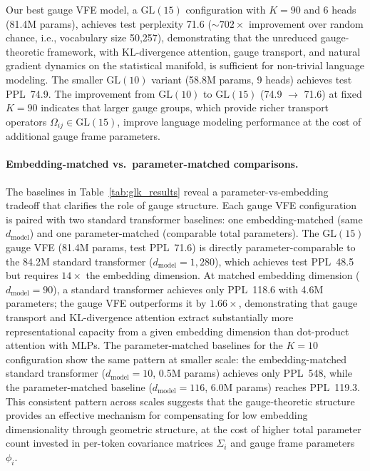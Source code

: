 \documentclass[twoside,11pt]{article}
\begin{document}
Our best gauge VFE model, a $\mathrm{GL}(15)$ configuration with $K = 90$ and 6 heads (81.4M params), achieves test perplexity 71.6 (${\sim}702\times$ improvement over random chance, i.e., vocabulary size 50{,}257), demonstrating that the unreduced gauge-theoretic framework, with KL-divergence attention, gauge transport, and natural gradient dynamics on the statistical manifold, is sufficient for non-trivial language modeling. The smaller $\mathrm{GL}(10)$ variant (58.8M params, 9 heads) achieves test PPL~74.9. The improvement from $\mathrm{GL}(10)$ to $\mathrm{GL}(15)$ (74.9 $\to$ 71.6) at fixed $K = 90$ indicates that larger gauge groups, which provide richer transport operators $\Omega_{ij} \in \mathrm{GL}(15)$, improve language modeling performance at the cost of additional gauge frame parameters.

\paragraph{Embedding-matched vs.\ parameter-matched comparisons.}
The baselines in Table~\ref{tab:glk_results} reveal a parameter-vs-embedding tradeoff that clarifies the role of gauge structure. Each gauge VFE configuration is paired with two standard transformer baselines: one embedding-matched (same $d_{\text{model}}$) and one parameter-matched (comparable total parameters). The $\mathrm{GL}(15)$ gauge VFE (81.4M params, test PPL~71.6) is directly parameter-comparable to the 84.2M standard transformer ($d_{\text{model}} = 1{,}280$), which achieves test PPL~48.5 but requires $14\times$ the embedding dimension. At matched embedding dimension ($d_{\text{model}} = 90$), a standard transformer achieves only PPL~118.6 with 4.6M parameters; the gauge VFE outperforms it by $1.66\times$, demonstrating that gauge transport and KL-divergence attention extract substantially more representational capacity from a given embedding dimension than dot-product attention with MLPs. The parameter-matched baselines for the $K\!=\!10$ configuration show the same pattern at smaller scale: the embedding-matched standard transformer ($d_{\text{model}} = 10$, 0.5M params) achieves only PPL~548, while the parameter-matched baseline ($d_{\text{model}} = 116$, 6.0M params) reaches PPL~119.3. This consistent pattern across scales suggests that the gauge-theoretic structure provides an effective mechanism for compensating for low embedding dimensionality through geometric structure, at the cost of higher total parameter count invested in per-token covariance matrices $\Sigma_i$ and gauge frame parameters $\phi_i$.
\end{document}
